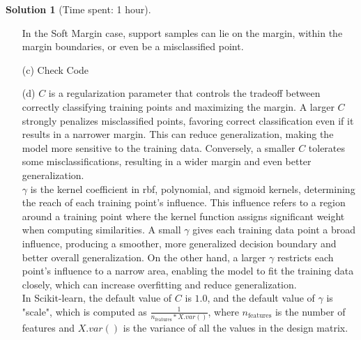 \documentclass[11pt, reqno, letterpaper, twoside]{amsart}
\theoremstyle{plain}
\theoremstyle{definition}
\newtheorem{solution}[theorem]{Solution}
\begin{document}
\begin{solution}[Time spent: 1 hour]
\begin{enumerate}

    \noindent In the Soft Margin case, support samples can lie on the margin, within the margin boundaries, or even be a misclassified point. 
    \item[(c)] Check Code
    
    \item[(d)] $C$ is a regularization parameter that controls the tradeoff between correctly classifying training points and maximizing the margin. A larger $C$ strongly penalizes misclassified points, favoring correct classification even if it results in a narrower margin. This can reduce generalization, making the model more sensitive to the training data. Conversely, a smaller $C$ tolerates some misclassifications, resulting in a wider margin and even better generalization. \\

    \noindent $\gamma$ is the kernel coefficient in rbf, polynomial, and sigmoid kernels, determining the reach of each training point's influence. This influence refers to a region around a training point where the kernel function assigns significant weight when computing similarities. A small $\gamma$ gives each training data point a broad influence, producing a smoother, more generalized decision boundary and better overall generalization. On the other hand, a larger $\gamma$ restricts each point's influence to a narrow area, enabling the model to fit the training data closely, which can increase overfitting and reduce generalization. \\  

    In Scikit-learn, the default value of $C$ is $1.0$, and the default value of $\gamma$ is "scale", which is computed as $\frac{1}{n_{\text{features}} * X.var()}$, where $n_{\text{features}}$ is the number of features and $X.var()$ is the variance of all the values in the design matrix. \\


\end{enumerate}
\end{solution}
\end{document}
